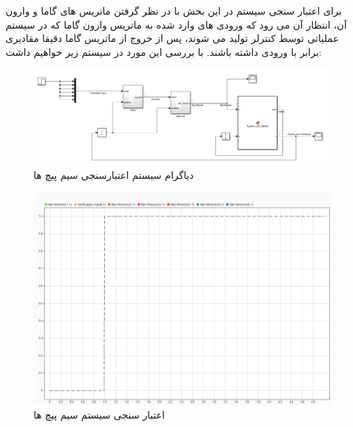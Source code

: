برای اعتبار سنجی سیستم در این بخش با در نظر گرفتن ماتریس های گاما و وارون آن، انتظار آن می رود که ورودی های وارد شده به ماتریس وارون گاما که در سیستم عملیاتی توسط کنترلر تولید می شوند، پس از خروج از ماتریس گاما دقیقا مقادیری برابر با ورودی داشته باشند. با بررسی این مورد در سیستم زیر خواهیم داشت:
\begin{figure}[H]
	\centering
	\includegraphics[width=1\linewidth]{../img/Gamma_Verification_diagram}
	\caption{دیاگرام سیستم اعتبارسنجی سیم پیچ ها}
	\label{fig:gammaverificationdiagram}
\end{figure}
\begin{figure}[H]
	\centering
	\includegraphics[width=1\linewidth]{../img/Gamma_Verification}
	\caption{اعتبار سنجی سیستم سیم پیچ ها}
	\label{fig:gammaverification}
\end{figure}

